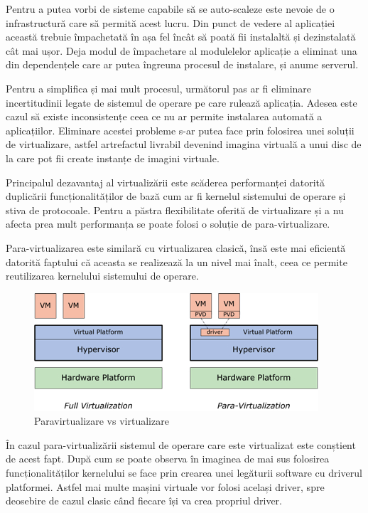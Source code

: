 \documentclass[12pt, a4paper, oneside, romanian]{teza-upb}
\begin{document}
Pentru a putea vorbi de sisteme capabile să se auto-scaleze este nevoie de o infrastructură care să permită acest lucru. Din punct de vedere al aplicației această trebuie împachetată în așa fel încât să poată fii instalaltă și dezinstalată cât mai ușor. Deja modul de împachetare al modulelelor aplicație a eliminat una din dependențele care ar putea îngreuna procesul de instalare, și anume serverul. 

Pentru a simplifica și mai mult procesul, următorul pas ar fi eliminare incertitudinii legate de sistemul de operare pe care rulează aplicația. Adesea este cazul să existe inconsistențe ceea ce nu ar permite instalarea automată a aplicațiilor. Eliminare acestei probleme s-ar putea face prin folosirea unei soluții de virtualizare, astfel artrefactul livrabil devenind imagina virtuală a unui disc de la care pot fii create instanțe de imagini virtuale. 

Principalul dezavantaj al virtualizării este scăderea performanței datorită duplicării funcționalităților de bază cum ar fi kernelul sistemului de operare și stiva de protocoale. Pentru a păstra flexibilitate oferită de virtualizare și a nu afecta prea mult performanța se poate folosi o soluție de para-virtualizare. 

Para-virtualizarea este similară cu virtualizarea clasică, însă este mai eficientă datorită faptului că aceasta se realizează la un nivel mai înalt, ceea ce permite reutilizarea kernelului sistemului de operare. 

\begin{figure}[ht]
\centering
\includegraphics[scale=0.8]{img/para-vs-virtualization.jpg}
\caption{Paravirtualizare vs virtualizare}
\label{fig:arhi_componente}
\end{figure}

În cazul para-virtualizării sistemul de operare care este virtualizat este conștient de acest fapt. După cum se poate observa în imaginea de mai sus folosirea funcționalităților kernelului se face prin crearea unei legăturii software cu driverul platformei. Astfel mai multe mașini virtuale vor folosi același driver, spre deosebire de cazul clasic când fiecare își va crea propriul driver.
\end{document}
